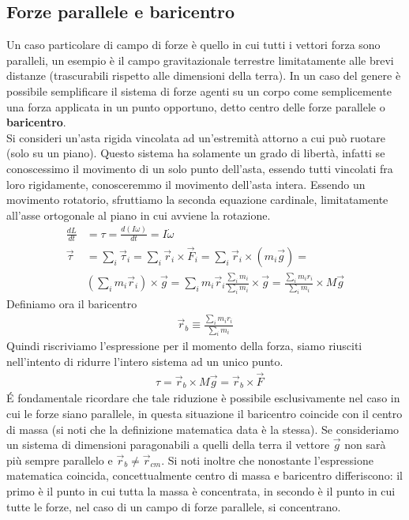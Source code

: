 \documentclass[10pt,a4paper]{article}
\begin{document}
\subsection{Forze parallele e baricentro}
Un caso particolare di campo di forze è quello in cui tutti i vettori forza sono paralleli, un esempio è il campo gravitazionale terrestre limitatamente alle brevi distanze (trascurabili rispetto alle dimensioni della terra). In un caso del genere è possibile semplificare il sistema di forze agenti su un corpo come semplicemente una forza applicata in un punto opportuno, detto centro delle forze parallele o \textbf{baricentro}. \\
Si consideri un'asta rigida vincolata ad un'estremità attorno a cui può ruotare (solo su un piano). Questo sistema ha solamente un grado di libertà, infatti se conoscessimo il movimento di un solo punto dell'asta, essendo tutti vincolati fra loro rigidamente, conosceremmo il movimento dell'asta intera. Essendo un movimento rotatorio, sfruttiamo la seconda equazione cardinale, limitatamente all'asse ortogonale al piano in cui avviene la rotazione.
\begin{align*}
	\frac{dL}{dt} &= \tau = \frac{d(I\omega)}{dt} = I \dot{\omega}\\
	\vec{\tau} &= \sum_i \vec{\tau}_i = \sum_i \vec{r}_i \times \vec{F}_i = \sum_i \vec{r}_i \times (m_i \vec{g}) =\\
	&(\sum_i m_i \vec{r}_i) \times \vec{g} = \sum_i m_i \vec{r}_i \frac{\sum_i m_i}{\sum_i m_i} \times \vec{g} = \frac{\sum_i m_i r_i }{\sum_i m_i} \times M \vec{g}
\end{align*}
Definiamo ora il baricentro
\begin{align*}
	\vec{r}_b \equiv \frac{\sum_i m_i r_i }{\sum_i m_i}
\end{align*}
Quindi riscriviamo l'espressione per il momento della forza, siamo riusciti nell'intento di ridurre l'intero sistema ad un unico punto. 
\begin{align*}
	&\tau = \vec{r}_b \times M \vec{g} = \vec{r}_b \times \vec{F}
\end{align*}
\'{E} fondamentale ricordare che tale riduzione è possibile esclusivamente nel caso in cui le forze siano parallele, in questa situazione il baricentro coincide con il centro di massa (si noti che la definizione matematica data è la stessa). Se consideriamo un sistema di dimensioni paragonabili a quelli della terra il vettore $\vec{g}$ non sarà più sempre parallelo e $\vec{r}_b \neq \vec{r}_{cm}$. Si noti inoltre che nonostante l'espressione matematica coincida, concettualmente centro di massa e baricentro differiscono: il primo è il punto in cui tutta la massa è concentrata, in secondo è il punto in cui tutte le forze, nel caso di un campo di forze parallele, si concentrano.
\end{document}
